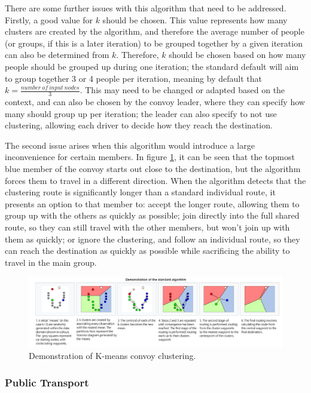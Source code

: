 \documentclass{article}
\begin{document}
There are some further issues with this algorithm that need to be addressed. Firstly, a good value for $k$ should be chosen. This value represents how many clusters are created by the algorithm, and therefore the average number of people (or groups, if this is a later iteration) to be grouped together by a given iteration can also be determined from $k$. Therefore, $k$ should be chosen based on how many people should be grouped up during one iteration; the standard default will aim to group together 3 or 4
%
%
people per iteration, meaning by default that $k=\frac{number\ of\ input\ nodes}{3}$. This may need to be changed or adapted based on the context, and can also be chosen by the convoy leader, where they can specify how many should group up per iteration; the leader can also specify to not use clustering, allowing each driver to decide how they reach the destination.

The second issue arises when this algorithm would introduce a large inconvenience for certain members. In figure \ref{nav-kmeans}, it can be seen that the topmost blue member of the convoy starts out close to the destination, but the algorithm forces them to travel in a different direction. When the algorithm detects that the clustering route is significantly longer than a standard individual route, it presents an option to that member to: accept the longer route, allowing them to group up with the others as quickly as possible; join directly into the full shared route, so they can still travel with the other members, but won't join up with them as quickly; or ignore the clustering, and follow an individual route, so they can reach the destination as quickly as possible while sacrificing the ability to travel in the main group.

\begin{figure}[H]
  \centering
  \includegraphics[scale=0.5]{kmeanscluster}
  \caption{Demonstration of K-means convoy clustering.}\label{nav-kmeans}
\end{figure}

\subsubsection{Public Transport}
\end{document}
